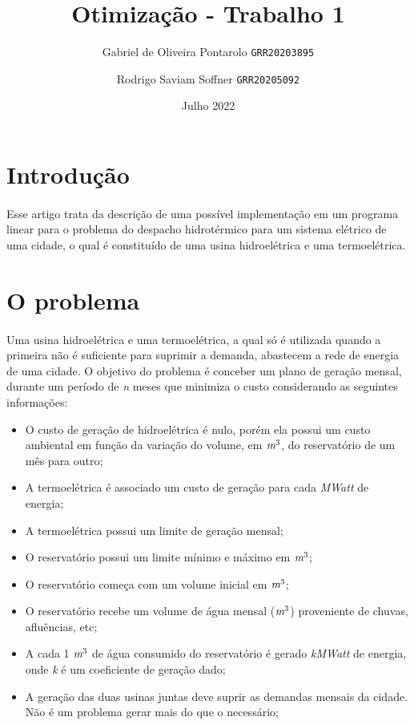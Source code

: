 \documentclass{article}
\title{Otimização - Trabalho 1}
\author{
    Gabriel de Oliveira Pontarolo 
    \texttt{GRR20203895}
    \and 
    Rodrigo Saviam Soffner
    \texttt{GRR20205092}
}
\date{Julho 2022}
\begin{document}
\maketitle

\section{Introdução}
\paragraph{} Esse artigo trata da descrição de uma possível implementação em um programa linear para o problema do despacho hidrotérmico para um sistema elétrico de uma cidade, o qual é constituído de uma usina hidroelétrica e uma termoelétrica.

\section{O problema}
\paragraph{} Uma usina hidroelétrica e uma termoelétrica, a qual só é utilizada quando a primeira não é suficiente para suprimir a demanda, abastecem a rede de energia de uma cidade. O objetivo do problema é conceber um plano de geração mensal, durante um período de \emph{n} meses que minimiza o custo considerando as seguintes informações:

\begin{itemize}
    \item O custo de geração de hidroelétrica é nulo, porém ela possui um custo ambiental em função da variação do volume, em $\emph{m}^3$, do reservatório de um mês para outro;
    \item A termoelétrica é associado um custo de geração para cada \emph{MWatt} de energia;
    \item A termoelétrica possui um limite de geração mensal;
    \item O reservatório possui um limite mínimo e máximo em $\emph{m}^3$;
    \item O reservatório começa com um volume inicial em $\emph{m}^3$;
    \item O reservatório recebe um volume de água mensal ($\emph{m}^3$) proveniente de chuvas, afluências, etc;
    \item A cada 1 $\emph{m}^3$ de água consumido do reservatório é gerado \emph{kMWatt} de energia, onde \emph{k} é um coeficiente de geração dado;
    \item A geração das duas usinas juntas deve suprir as demandas mensais da cidade. Não é um problema gerar mais do que o necessário;
\end{itemize}
\end{document}
